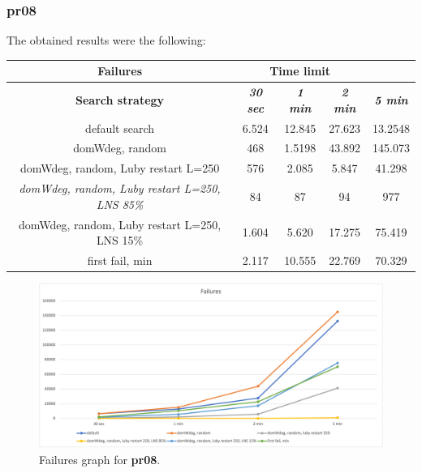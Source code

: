 \subsubsection{pr08}
The obtained results were the following:
{
\renewcommand{\arraystretch}{2}
\begin{longtable}[h]{| c | c | c | c | c |}
    \hline
    \textbf{Failures} & \multicolumn{3}{c}{Time limit} & \\
    \hline
    \textbf{Search strategy} & \textbf{\textit{30 sec}} & \textbf{\textit{1 min}} & \textbf{\textit{2 min}} & \textbf{\textit{5 min}} \\
    \hline
    \endhead
    default search                                         & 6.524 & 12.845 &  27.623 & 13.2548 \\
    \hline
    domWdeg, random                                        &  468 & 1.5198 &  43.892 & 145.073 \\
    \hline
    domWdeg, random, Luby restart L=250                    &  576 &  2.085 &   5.847 &  41.298 \\
    \hline
    \textit{domWdeg, random, Luby restart L=250, LNS 85\%} &   84 &    87 &     94 &    977 \\
    \hline
    domWdeg, random, Luby restart L=250, LNS 15\%          & 1.604 &  5.620 &  17.275 &  75.419 \\
    \hline
    first fail, min                                        & 2.117 & 10.555 &  22.769 &  70.329 \\
    \hline
\end{longtable}
}
\begin{figure}[H]
    \centering
    \includegraphics[width=0.8\columnwidth]{../graphs/pr08-failures.png}
    \caption{Failures graph for \textbf{pr08}.}
\end{figure}


